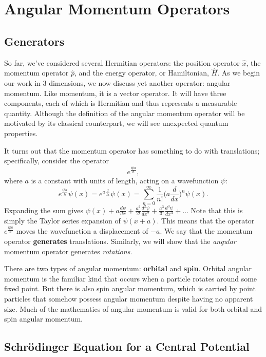 \section{Angular Momentum Operators}
\subsection{Generators}\label{generators}

So far, we've considered several Hermitian operators: the position operator $\hat{x}$, the momentum operator $\hat{p}$, and the energy operator, or Hamiltonian, $\hat{H}$. As we begin our work in $3$ dimensions, we now discuss yet another operator: angular momentum. Like momentum, it is a vector operator. It will have three components, each of which is Hermitian and thus represents a measurable quantity. Although the definition of the angular momentum operator will be motivated by its classical counterpart, we will see unexpected quantum properties.

It turns out that the momentum operator has something to do with translations; specifically, consider the operator $$e^{\frac{i\hat{p}a}{\hbar}},$$where $a$ is a constant with units of length, acting on a wavefunction $\psi$: $$e^{\frac{i\hat{p}a}{\hbar}}\psi(x)=e^{a\frac{d}{dx}}\psi(x)=\sum_{n=0}^\infty\frac{1}{n!}\bigg(a\frac{d}{dx}\bigg)^n\psi(x).$$Expanding the sum gives $\psi(x)+a\frac{d\psi}{dx}+\frac{a^2}{2!}\frac{d^2\psi}{dx^2}+\frac{a^3}{3!}\frac{d^3\psi}{dx^3}+\ldots$ Note that this is simply the Taylor series expansion of $\psi(x+a)$. This means that the operator $e^{\frac{i\hat{p}a}{\hbar}}$ moves the wavefunction a displacement of $-a$. We say that the momentum operator \textbf{generates} translations. Similarly, we will show that the \textit{angular} momentum operator generates \textit{rotations}.

\begin{framedrmk*}
    There are two types of angular momentum: \textbf{orbital} and \textbf{spin}. Orbital angular momentum is the familiar kind that occurs when a particle rotates around some fixed point. But there is also spin angular momentum, which is carried by point particles that somehow possess angular momentum despite having no apparent size. Much of the mathematics of angular momentum is valid for both orbital and spin angular momentum.
\end{framedrmk*}

\subsection{Schrödinger Equation for a Central Potential}\label{schrodinger_central_potential}

